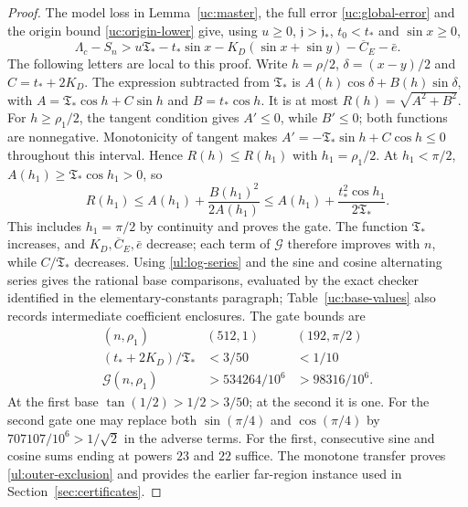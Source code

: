 \begin{proof}
The model loss in Lemma~\ref{uc:master}, the full error
\eqref{uc:global-error} and the origin bound \eqref{uc:origin-lower} give, using $u\geq0$, $\mathfrak j>\mathfrak j_*$,
$t_0<t_*$ and $\sin x\geq0$,
\[
 \Lambda_c-S_n>u\mathfrak T_*-t_*\sin x-K_D(\sin x+\sin y)
                         -\overline C_E-\bar e.
\]
The following letters are local to this proof. Write $h=\rho/2$, $\delta=(x-y)/2$ and $C=t_*+2K_D$.
The expression subtracted from $\mathfrak T_*$ is
$A(h)\cos\delta+B(h)\sin\delta$, with
$A=\mathfrak T_*\cos h+C\sin h$ and $B=t_*\cos h$.
It is at most $R(h)=\sqrt{A^2+B^2}$. For $h\geq\rho_1/2$,
the tangent condition gives $A'\leq0$, while $B'\leq0$;
both functions are nonnegative. Monotonicity of tangent makes
$A'=-\mathfrak T_*\sin h+C\cos h\leq0$ throughout this interval.
Hence $R(h)\leq R(h_1)$ with $h_1=\rho_1/2$.
At $h_1<\pi/2$, $A(h_1)\geq\mathfrak T_*\cos h_1>0$, so
\[
 R(h_1)\leq A(h_1)+\frac{B(h_1)^2}{2A(h_1)}
       \leq A(h_1)+\frac{t_*^2\cos h_1}{2\mathfrak T_*}.
\]
This includes $h_1=\pi/2$ by continuity and proves the gate.
The function $\mathfrak T_*$ increases, and $K_D,\overline C_E,\bar e$
decrease; each term of $\mathcal G$ therefore improves with $n$, while
$C/\mathfrak T_*$ decreases. Using \eqref{ul:log-series} and the sine and
cosine alternating series gives the rational base comparisons, evaluated by the exact checker
identified in the elementary-constants paragraph; Table~\ref{uc:base-values}
also records intermediate coefficient enclosures. The gate bounds are
\[
 \begin{array}{ccc}
 (n,\rho_1)&(512,1)&(192,\pi/2)\\ \hline
 (t_*+2K_D)/\mathfrak T_*&<3/50&<1/10\\
 \mathcal G(n,\rho_1)&>534264/10^6&>98316/10^6.
 \end{array}
\]
At the first base $\tan(1/2)>1/2>3/50$; at the second it is one.
For the second gate one may replace both $\sin(\pi/4)$ and
$\cos(\pi/4)$ by $707107/10^6>1/\sqrt2$ in the adverse terms.
For the first, consecutive sine and cosine sums ending at powers
$23$ and $22$ suffice. The monotone transfer proves
\eqref{ul:outer-exclusion} and provides the earlier far-region
instance used in Section~\ref{sec:certificates}.
\end{proof}

